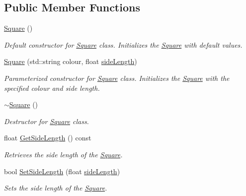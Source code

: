 \subsection*{Public Member Functions}
\begin{DoxyCompactItemize}
\item 
\mbox{\label{class_square_a3dc7ff9aefc2725172b5d3153973d243}} 
\mbox{\hyperlink{class_square_a3dc7ff9aefc2725172b5d3153973d243}{Square}} ()
\begin{DoxyCompactList}\small\item\em Default constructor for \mbox{\hyperlink{class_square}{Square}} class. Initializes the \mbox{\hyperlink{class_square}{Square}} with default values. \end{DoxyCompactList}\item 
\mbox{\hyperlink{class_square_ad1c9965627cb2f69fea114f1031e99cb}{Square}} (std\+::string colour, float \mbox{\hyperlink{class_square_a90b0c01a55a5f061e96b2d88724b130d}{side\+Length}})
\begin{DoxyCompactList}\small\item\em Parameterized constructor for \mbox{\hyperlink{class_square}{Square}} class. Initializes the \mbox{\hyperlink{class_square}{Square}} with the specified colour and side length. \end{DoxyCompactList}\item 
\mbox{\hyperlink{class_square_a90af7ce1060cff7b717ceddb333846b8}{$\sim$\+Square}} ()
\begin{DoxyCompactList}\small\item\em Destructor for \mbox{\hyperlink{class_square}{Square}} class. \end{DoxyCompactList}\item 
float \mbox{\hyperlink{class_square_a84b60d7f474609a2772a1d4213bcc7d9}{Get\+Side\+Length}} () const
\begin{DoxyCompactList}\small\item\em Retrieves the side length of the \mbox{\hyperlink{class_square}{Square}}. \end{DoxyCompactList}\item 
bool \mbox{\hyperlink{class_square_a2ca9671502705098ec6dac551d437ebe}{Set\+Side\+Length}} (float \mbox{\hyperlink{class_square_a90b0c01a55a5f061e96b2d88724b130d}{side\+Length}})
\begin{DoxyCompactList}\small\item\em Sets the side length of the \mbox{\hyperlink{class_square}{Square}}. \end{DoxyCompactList}\item 

\end{DoxyCompactItemize}

